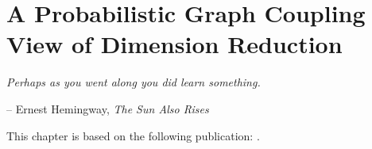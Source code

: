 
\chapter{A Probabilistic Graph Coupling View of Dimension Reduction}\label{chapter:GraphCoupling}

\epigraph{\itshape Perhaps as you went along you did learn something.}{-- Ernest Hemingway, \textit{The Sun Also Rises}}

\minitoc

This chapter is based on the following publication: \cite{van2022probabilistic}.





